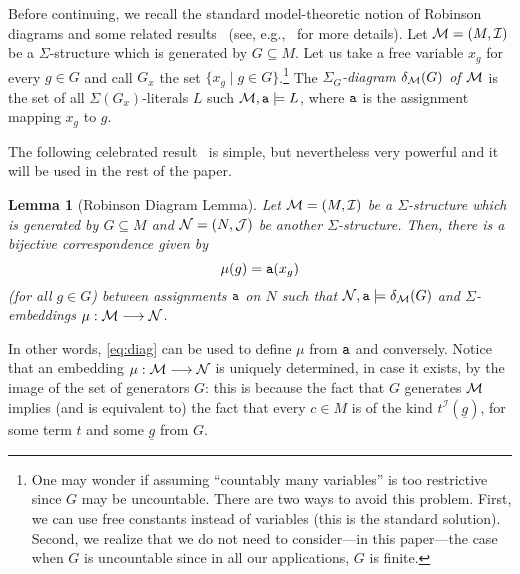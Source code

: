 \documentclass{LMCS}
\newcommand{\ug}{\ensuremath{\underline g}}
\newcommand{\cM}{\ensuremath \mathcal M}
\newcommand{\cN}{\ensuremath \mathcal N}
\renewcommand{\int}{\ensuremath {\mathcal I}}
\theoremstyle{plain}\newtheorem{assumption}[thm]{Assumption}
\theoremstyle{plain}\newtheorem{proposition}[thm]{Proposition}
\theoremstyle{plain}\newtheorem{property}[thm]{Property}
\theoremstyle{plain}\newtheorem{example}[thm]{Example}
\theoremstyle{plain}\newtheorem{claim}[thm]{Claim}
\theoremstyle{plain}\newtheorem{lemma}[thm]{Lemma}
\begin{document}
Before continuing, we recall the standard model-theoretic notion of
Robinson diagrams and some related results~ (see, e.g.,~\cite{CK} for
more details).  Let $\cM=(M, \int)$ be a $\Sigma$-structure which is
generated by $G\subseteq M$. Let us take a free variable $x_g$ for
every $g\in G$ and call $G_x$ the set $\{x_g\mid g\in
G\}$.\footnote{One may wonder if assuming ``countably many variables'' is too
  restrictive since $G$ may be uncountable.  There are two ways to
  avoid this problem.  First, we can use free constants instead of
  variables (this is the standard solution).  Second, we realize that
  we do not need to consider---in this paper---the case when $G$ is
  uncountable since in all our applications, $G$ is finite.} The
\emph{$\Sigma_G$-diagram $\delta_{\cM}(G)$ of $\cM$} is the set of all
$\Sigma(G_x)$-literals $L$ such $\cM, {\tt a}\models L$, where ${\tt
  a}$ is the assignment mapping $x_g$ to $g$.

The following celebrated result~\cite{CK} is simple, but nevertheless
very powerful and it will be used in the rest of the paper.
\begin{lemma}[Robinson Diagram Lemma]
  \label{lem:robinson}
  Let $\cM=(M, \int)$ be a $\Sigma$-structu\-re which is generated by
  $G\subseteq M$ and $\cN=(N, \mathcal{J})$ be another
  $\Sigma$-structure.  Then, there is a bijective correspondence given
  by
  \begin{equation}\label{eq:diag}
    \mu(g) = {\tt a}(x_g)
  \end{equation}
  (for all $g\in G$) between assignments ${\tt a}$ on $N$ such that
  $\cN, {\tt a}\models \delta_{\cM}(G)$ and $\Sigma$-embeddings
  $\mu:\cM\longrightarrow \cN$.
\end{lemma}
In other words, \eqref{eq:diag} can be used to define $\mu$ from ${\tt
  a}$ and conversely. Notice that an embedding $\mu:\cM
\longrightarrow \cN$ is uniquely determined, in case it exists, by the
image of the set of generators $G$: this is because the fact that $G$
generates $\cM$ implies (and is equivalent to) the fact that every
$c\in M$ is of the kind $t^{\int}(\ug)$, for some term $t$ and some
$\ug$ from $G$.
\end{document}
